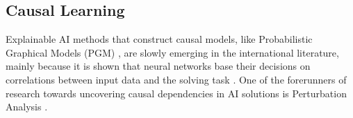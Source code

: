 \documentclass[twoside,11pt]{article}
\begin{document}



\subsection{Causal Learning}
\label{sec:CausalLearning}

Explainable AI methods that construct causal models, like Probabilistic Graphical Models (PGM) \cite{Koller:2009:ProbabilisticGraphicalModelsBook}, \cite{Saranti:2019:LearningCompetencePGMs} are slowly emerging in the international literature, mainly because it is shown that neural networks base their decisions on correlations between input data and the solving task \cite{Lapuschkin:2019:UnmaskingCleverHans}. One of the forerunners of research towards uncovering causal dependencies in AI solutions is Perturbation Analysis \cite{Arras:2017:ExplainingRNNsPerturbationAnalysis}. 
\end{document}
